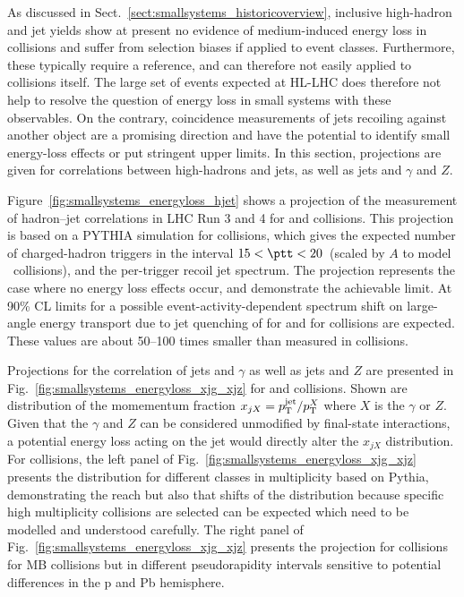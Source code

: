 \documentclass[../report.tex]{subfiles}
\begin{document}
As discussed in Sect.~\ref{sect:smallsystems_historicoverview}, inclusive high-\pT hadron and jet yields show at present no evidence of medium-induced energy loss in \pPb collisions and suffer from selection biases if applied to event classes. Furthermore, these typically require a \pp reference, and can therefore not easily applied to \pp collisions itself. The large set of events expected at HL-LHC does therefore not help to resolve the question of energy loss in small systems with these observables. On the contrary, coincidence measurements of jets recoiling against another object are a promising direction and have the potential to identify small energy-loss effects or put stringent upper limits. In this section, projections are given for correlations between high-\pT hadrons and jets, as well as jets and $\gamma$ and $Z$.

Figure~\ref{fig:smallsystems_energyloss_hjet} shows a projection of the measurement of hadron--jet correlations in LHC Run 3 and 4 for \pp and \pPb collisions.
This projection is based on a PYTHIA simulation for \pp collisions, which gives the expected number of charged-hadron triggers in the interval $15<\ptt<20$~\UGeV (scaled by $A$ to model \pPb\ collisions), and the per-trigger recoil jet spectrum.
The projection represents the case where no energy loss effects occur, and demonstrate the achievable limit. At 90\% CL limits for a possible event-activity-dependent spectrum shift on large-angle energy transport due to jet quenching of \unit[70]{\UMeVc} for \pPb and \unit[175]{\UMeVc} for \pp collisions are expected. These values are about 50--100 times smaller than measured in \PbPb collisions.

Projections for the correlation of jets and $\gamma$ as well as jets and $Z$ are presented in Fig.~\ref{fig:smallsystems_energyloss_xjg_xjz} for \pp and \pPb collisions. Shown are distribution of the momementum fraction $x_{jX} = p\sb{\scriptstyle\mathrm{T}}^{\rm jet}/p\sb{\scriptstyle\mathrm{T}}^X$ where $X$ is the $\gamma$ or $Z$. Given that the $\gamma$ and $Z$ can be considered unmodified by final-state interactions, a potential energy loss acting on the jet would directly alter the $x_{jX}$ distribution. For \pp collisions, the left panel of Fig.~\ref{fig:smallsystems_energyloss_xjg_xjz} presents the distribution for different classes in multiplicity based on Pythia, demonstrating the reach but also that shifts of the distribution because specific high multiplicity collisions are selected can be expected which need to be modelled and understood carefully. The right panel of Fig.~\ref{fig:smallsystems_energyloss_xjg_xjz} presents the projection for \pPb collisions for MB collisions but in different pseudorapidity intervals sensitive to potential differences in the p and Pb hemisphere.
\end{document}
